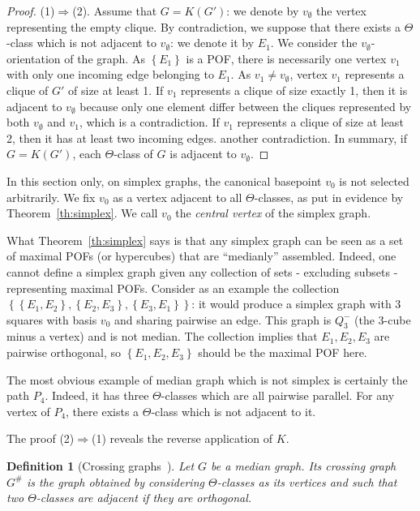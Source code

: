 \documentclass{article}
\newtheorem{definition}{Definition}
\newcommand{\set}[1]{\left\{ #1 \right\}}
\begin{document}
\begin{proof}
(1)$\Rightarrow$(2). Assume that $G=K(G')$: we denote by $v_{\emptyset}$ the vertex representing the empty clique. By contradiction, we suppose that there exists a $\Theta$-class which is not adjacent to $v_{\emptyset}$: we denote it by $E_1$. We consider the $v_{\emptyset}$-orientation of the graph. As $\set{E_1}$ is a POF, there is necessarily one vertex $v_1$ with only one incoming edge belonging to $E_1$. As $v_1 \neq v_{\emptyset}$, vertex $v_1$ represents a clique of $G'$ of size at least 1. If $v_1$ represents a clique of size exactly 1, then it is adjacent to $v_{\emptyset}$ because only one element differ between the cliques represented by both $v_{\emptyset}$ and $v_1$, which is a contradiction. If $v_1$ represents a clique of size at least 2, then it has at least two incoming edges. another contradiction. In summary, if $G=K(G')$, each $\Theta$-class of $G$ is adjacent to $v_{\emptyset}$.
\end{proof}

In this section only, on simplex graphs, the canonical basepoint $v_0$ is not selected arbitrarily. We fix $v_0$ as a vertex adjacent to all $\Theta$-classes, as put in evidence by Theorem~\ref{th:simplex}. We call $v_0$ the \textit{central vertex} of the simplex graph.

What Theorem~\ref{th:simplex} says is that any simplex graph can be seen as a set of maximal POFs (or hypercubes) that are ``medianly'' assembled. Indeed, one cannot define a simplex graph given any collection of sets - excluding subsets - representing maximal POFs. Consider as an example the collection $\set{\set{E_1,E_2},\set{E_2,E_3},\set{E_3,E_1}}$: it would produce a simplex graph with 3 squares with basis $v_0$ and sharing pairwise an edge. This graph is $Q_3^-$ (the 3-cube minus a vertex) and is not median. The collection implies that $E_1,E_2,E_3$ are pairwise orthogonal, so $\set{E_1,E_2,E_3}$ should be the maximal POF here.

The most obvious example of median graph which is not simplex is certainly the path $P_4$. Indeed, it has three $\Theta$-classes which are all pairwise parallel. For any vertex of $P_4$, there exists a $\Theta$-class which is not adjacent to it.

The proof (2)$\Rightarrow$(1) reveals the reverse application of $K$. 

\begin{definition}[Crossing graphs~\cite{BaVe89,KlMu02}]
Let $G$ be a median graph. Its \textit{crossing graph} $G^{\#}$ is the graph obtained by considering $\Theta$-classes as its vertices and such that two $\Theta$-classes are adjacent if they are orthogonal.
\label{def:crossing}
\end{definition}
\end{document}
